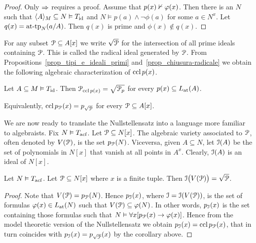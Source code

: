 \begin{proof}
  Only $\IMP$ requires a proof.
  Assume that $p(x)\notproves\phi(x)$.
  Then there is an $N$ such that $\<A\>_M\subseteq N\models T_{\rm id}$ and $N\models p(a)\wedge\neg\phi(a)$ for some $a\in N^{x}$.
  Let $q(x)=\attp_N(a/A)$.
  Then $q(x)$ is prime and $\phi(x)\notin q(x)$.
\end{proof}

For any subset $\P\subseteq A[x]$ we write \emph{$\sqrt{\P}$\/} for the intersection of all prime ideals containing $\P$.
This is called the radical ideal generated by $\P$.
From Propositions~\ref{prop_tipi_e_ideali_primi} and~\ref{prop_chiusura-radicale} we obtain the following algebraic characterization of $\ccl\,p(x)$.

\begin{corollary}\label{corol_chiusura_radicale}
  Let $A\subseteq M\models T_{\rm id}$.
  Then $\P_{\ccl\,p(x)}=\sqrt{\P_p}$ for every $p(x)\subseteq\atL(A)$.

  Equivalently, $\ccl\,p_\P(x)=p_{\sqrt{\P}}$ for every $\P\subseteq A[x]$.
\end{corollary}

We are now ready to translate the Nullstellensatz into a language more familiar to algebraists.
Fix $N\models T_{\rm acf}$.
Let $\P\subseteq N[x]$.
The algebraic variety associated to $\P$, often denoted by \emph{$V(\P)$,} is the set $p_\P(N)$.
Viceversa, given $A\subseteq N$, let \emph{$\I(A)$\/} be the set of polynomials in $N[x]$ that vanish at all points in $A^x$.
Clearly, $\I(A)$ is an ideal of $N[x]$.

\begin{void}\label{thm_Nullstellensatz2}
  Let $N\models T_{\rm acf}$. 
  Let $\P\subseteq N[x]$ where $x$ is a finite tuple.
  Then $\I\big(V(\P)\big)=\sqrt{\P}$.
\end{void}

\begin{proof}
  Note that $V(\P)=p_\P(N)$.
  Hence $p_{\I}(x)$, where $\I=\I(V(\P))$, is the set of formulas $\phi(x)\in\atL(N)$ such that $V(\P)\subseteq\phi(N)$.
  In other words, $p_{\I}(x)$ is the set containing those formulas such that $N\models\A x[p_\P(x)\imp\phi(x)]$.
  Hence from the model theoretic version of the Nullstellensatz we obtain $p_{\I}(x)=\ccl\,p_\P(x)$, that in turn coincides with $p_{\I}(x)=p_{\sqrt{\P}}(x)$ by the corollary above.
\end{proof}

